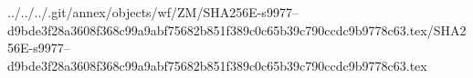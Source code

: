 ../../../.git/annex/objects/wf/ZM/SHA256E-s9977--d9bde3f28a3608f368c99a9abf75682b851f389c0c65b39c790ccdc9b9778c63.tex/SHA256E-s9977--d9bde3f28a3608f368c99a9abf75682b851f389c0c65b39c790ccdc9b9778c63.tex